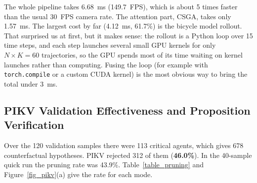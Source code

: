 \documentclass[preprint,12pt]{elsarticle}
\begin{document}
The whole pipeline takes 6.68~ms (149.7~FPS), which is about 5 times faster than the usual 30~FPS camera rate. The attention part, CSGA, takes only 1.57~ms. The largest cost by far (4.12~ms, 61.7\%) is the bicycle model rollout. That surprised us at first, but it makes sense: the rollout is a Python loop over 15 time steps, and each step launches several small GPU kernels for only $N \times K = 60$ trajectories, so the GPU spends most of its time waiting on kernel launches rather than computing. Fusing the loop (for example with \texttt{torch.compile} or a custom CUDA kernel) is the most obvious way to bring the total under 3~ms.

\subsection{PIKV Validation Effectiveness and Proposition Verification}
Over the 120 validation samples there were 113 critical agents, which gives 678 counterfactual hypotheses. PIKV rejected 312 of them (\textbf{46.0\%}). In the 40-sample quick run the pruning rate was 43.9\%. Table~\ref{table_pruning} and Figure~\ref{fig_pikv}(a) give the rate for each mode.

\begin{table}[H]
\caption{PIKV hypothesis pruning across the six counterfactual modes (678 hypotheses, 113 per mode, from real traffic validation samples).}
\label{table_pruning}
\centering
{}
\end{table}
\end{document}
